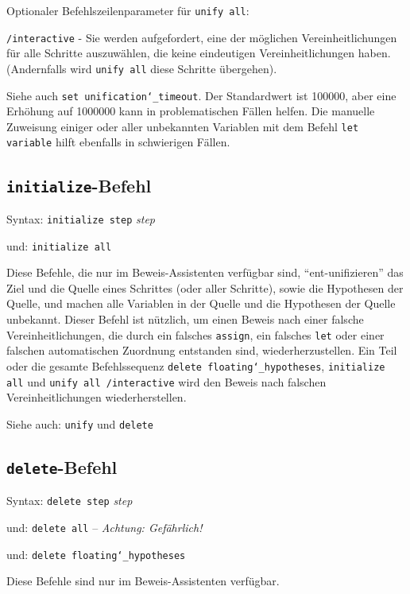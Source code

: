 Optionaler Befehlszeilenparameter für \texttt{unify all}:

    \texttt{/interactive} - Sie werden aufgefordert, eine der möglichen Vereinheitlichungen für alle Schritte auszuwählen, die keine eindeutigen Vereinheitlichungen haben.  (Andernfalls wird \texttt{unify all} diese Schritte übergehen).

Siehe auch \texttt{set unification{\char`\_}timeout}.  Der Standardwert ist 100000, aber eine Erhöhung auf 1000000 kann in problematischen Fällen helfen.  Die manuelle Zuweisung einiger oder aller unbekannten Variablen mit dem Befehl \texttt{let variable} hilft ebenfalls in schwierigen Fällen. 


\subsection{\texttt{initialize}-Befehl}

Syntax:  \texttt{initialize step} {\em step}

    und: \texttt{initialize all}

Diese Befehle, die nur im Beweis-Assistenten verfügbar sind, "`ent-unifizie\-ren"' das Ziel und die Quelle eines Schrittes (oder aller Schritte), sowie die Hypothesen der Quelle, und machen alle Variablen in der Quelle und die Hypothesen der Quelle unbekannt.  Dieser Befehl ist nützlich, um einen Beweis nach einer falsche Vereinheitlichungen, die durch ein falsches \texttt{assign}, ein falsches \texttt{let} oder einer falschen automatischen Zuordnung entstanden sind, wiederherzustellen.  Ein Teil oder die gesamte Befehlssequenz \texttt{delete floating{\char`\_}hypotheses}, \texttt{initialize all} und \texttt{unify all /interactive}\linebreak
wird den Beweis nach falschen Vereinheitlichungen wiederherstellen.

Siehe auch:  \texttt{unify} und \texttt{delete}


\subsection{\texttt{delete}-Befehl}
Syntax:  \texttt{delete step} {\em step}

   und:      \texttt{delete all} -- {\em Achtung: Gefährlich!}

   und:      \texttt{delete floating{\char`\_}hypotheses}

Diese Befehle sind nur im Beweis-Assistenten verfügbar.

